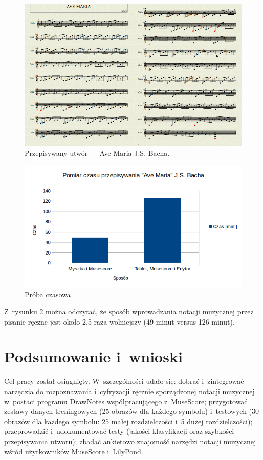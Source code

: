 \documentclass[polish,thesis,12pt]{dcsbook}
\begin{document}
\begin{figure}[H]
  \centering
  \includegraphics[scale=0.5,bb=0 0 816 534]{img/AveMaria.png}
  \caption{Przepisywany utwór --- Ave Maria J.S. Bacha.}
  \label{avemaria}
\end{figure}
\begin{figure}[H]
  \centering
  \includegraphics[scale=0.95,bb=0 0 605 340]{img/time.png}
  \caption{Próba czasowa}
  \label{time}
\end{figure}
Z~rysunku \ref{time} można odczytać, że sposób wprowadzania notacji muzycznej przez pisanie ręczne jest około 2,5 raza wolniejszy (49 minut versus 126 minut).

\chapter{Podsumowanie i~wnioski}
Cel pracy został osiągnięty. W~szczególności udało się: dobrać i~zintegrować narzędzia do rozpoznawania i~cyfryzacji ręcznie sporządzonej notacji muzycznej w~postaci programu DrawNotes współpracującego z~MuseScore; przygotować zestawy danych treningowych (25 obrazów dla każdego symbolu) i~testowych (30 obrazów dla każdego symbolu: 25 małej rozdzielczości i~5 dużej rozdzielczości); przeprowadzić i~udokumentować testy (jakości klasyfikacji oraz szybkości przepisywania utworu); zbadać ankietowo znajomość narzędzi notacji muzycznej wśród użytkowników MuseScore i~LilyPond.
\end{document}
